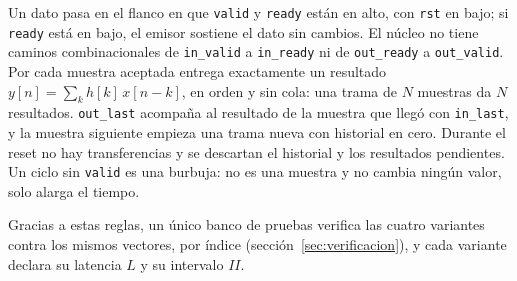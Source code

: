Un dato pasa en el flanco en que \texttt{valid} y \texttt{ready} están en alto, con \texttt{rst} en bajo; si \texttt{ready} está en bajo, el emisor sostiene el dato sin cambios. El núcleo no tiene caminos combinacionales de \texttt{in\_valid} a \texttt{in\_ready} ni de \texttt{out\_ready} a \texttt{out\_valid}. Por cada muestra aceptada entrega exactamente un resultado $y[n] = \sum_k h[k]\,x[n-k]$, en orden y sin cola: una trama de $N$ muestras da $N$ resultados. \texttt{out\_last} acompaña al resultado de la muestra que llegó con \texttt{in\_last}, y la muestra siguiente empieza una trama nueva con historial en cero. Durante el reset no hay transferencias y se descartan el historial y los resultados pendientes. Un ciclo sin \texttt{valid} es una burbuja: no es una muestra y no cambia ningún valor, solo alarga el tiempo.

Gracias a estas reglas, un único banco de pruebas verifica las cuatro variantes contra los mismos vectores, por índice (sección~\ref{sec:verificacion}), y cada variante declara su latencia $L$ y su intervalo $II$.
